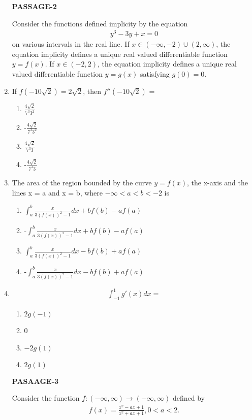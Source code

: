 \begin{enumerate}[label=\arabic*.,ref=\thesubsection.\theenumi]
\textbf{PASSAGE-2}

Consider the functions defined implicity by the equation
\begin{align}
y^3 - 3y + x = 0
\end{align}
on various intervals in the real line. If $x \in (-\infty, -2) \cup (2, \infty)$, the equation implicity defines a unique real valued differentiable function $y = f(x)$. If $x \in (-2, 2)$, the equation implicity defines a unique real valued differentiable function $y = g(x)$ satisfying $g(0) = 0$.

\item If $f(-10\sqrt{2}) = 2\sqrt{2}$, then $f''(-10\sqrt{2})$ = 
\begin{enumerate}
\item $\frac{4\sqrt{2}}{7^{3}3^{2}}$
\item -$\frac{4\sqrt{2}}{7^{3}3^{2}}$
\item $\frac{4\sqrt{2}}{7^{3}3}$
\item -$\frac{4\sqrt{2}}{7^{3}3}$
\end{enumerate}

\item The area of the region bounded by the curve $y = f(x)$, the x-axis and the lines x = a and x = b, where $-\infty < a < b < -2$ is
\begin{enumerate}
\item $\int_{a}^{b}\frac{x}{3(f(x))^2 - 1}dx + bf(b) - af(a)$
\item -$\int_{a}^{b}\frac{x}{3(f(x))^2 - 1}dx + bf(b) - af(a)$
\item $\int_{a}^{b}\frac{x}{3(f(x))^2 - 1}dx - bf(b) + af(a)$
\item -$\int_{a}^{b}\frac{x}{3(f(x))^2 - 1}dx - bf(b) + af(a)$
\end{enumerate}

\item 
\begin{align*}
\int_{-1}^{1}g'(x)dx =
\end{align*} 
\begin{enumerate}
\item $2g(-1)$
\item 0
\item $-2g(1)$
\item $2g(1)$
\end{enumerate}

\textbf{PASAAGE-3}

Consider the function $f: (-\infty, \infty) \to (-\infty, \infty)$ defined by
\begin{align*}
f(x) = \frac{x^2 - ax + 1}{x^2 + ax + 1}, 0 < a < 2.
\end{align*}


\end{enumerate}
